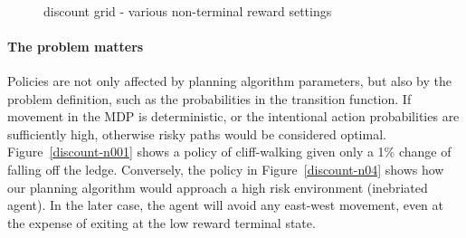 \documentclass{sig-alternate}
\begin{document}
\begin{figure}[!htbp]
    \centering
    ~
    \\
    \caption{discount grid - various non-terminal reward settings}
\end{figure} 

\paragraph{The problem matters}

Policies are not only affected by planning algorithm parameters, but also by the problem definition, such as the probabilities in the transition function. If movement in the MDP is deterministic, or the intentional action probabilities are sufficiently high, otherwise risky paths would be considered optimal. Figure~\ref{discount-n001} shows a policy of cliff-walking given only a 1\% change of falling off the ledge. Conversely, the policy in Figure~\ref{discount-n04} shows how our planning algorithm would approach a high risk environment (inebriated agent). In the later case, the agent will avoid any east-west movement, even at the expense of exiting at the low reward terminal state.
\end{document}
